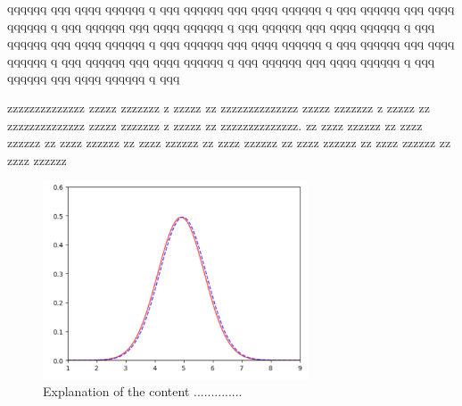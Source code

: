 qqqqqq qqq qqqq qqqqqq q qqq
qqqqqq qqq qqqq qqqqqq q qqq
qqqqqq qqq qqqq qqqqqq q qqq
qqqqqq qqq qqqq qqqqqq q qqq
qqqqqq qqq qqqq qqqqqq q qqq
qqqqqq qqq qqqq qqqqqq q qqq
qqqqqq qqq qqqq qqqqqq q qqq
qqqqqq qqq qqqq qqqqqq q qqq
qqqqqq qqq qqqq qqqqqq q qqq
qqqqqq qqq qqqq qqqqqq q qqq
qqqqqq qqq qqqq qqqqqq q qqq

 zzzzzzzzzzzzzz
zzzzz zzzzzzz z zzzzz zz zzzzzzzzzzzzzz
zzzzz zzzzzzz z zzzzz zz zzzzzzzzzzzzzz
zzzzz zzzzzzz z zzzzz zz zzzzzzzzzzzzzz.
zz zzzz zzzzzz 
zz zzzz zzzzzz
zz zzzz zzzzzz
zz zzzz zzzzzz
zz zzzz zzzzzz
zz zzzz zzzzzz
zz zzzz zzzzzz
zz zzzz zzzzzz

\begin{figure}[t!]
\centering
\includegraphics[width=0.7\textwidth]{./FIG/Gaussiane.png}
\caption{Explanation of the content ..............}
\label{fig:2.3}
\end{figure}
